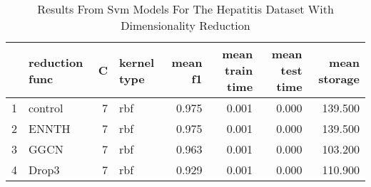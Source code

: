 \begin{table}
\centering
\caption{Results From Svm Models For The Hepatitis Dataset With Dimensionality Reduction}
\label{tab:svm_reduction_results_hepatitis}
\begin{tabular}{rlrlrrrr}
\toprule
 & reduction func & C & kernel type & mean f1 & mean train time & mean test time & mean storage \\
\midrule
1 & control & 7 & rbf & 0.975 & 0.001 & 0.000 & 139.500 \\
2 & ENNTH & 7 & rbf & 0.975 & 0.001 & 0.000 & 139.500 \\
3 & GGCN & 7 & rbf & 0.963 & 0.001 & 0.000 & 103.200 \\
4 & Drop3 & 7 & rbf & 0.929 & 0.001 & 0.000 & 110.900 \\
\bottomrule
\end{tabular}
\end{table}
